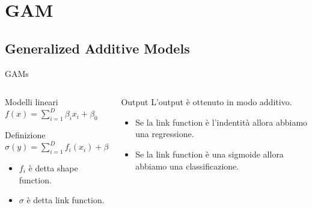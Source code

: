 \section{GAM}

\subsection{Generalized Additive Models}

\begin{frame}{GAMs}
    \begin{columns}
        \begin{column}{.45\textwidth}
            \begin{block}{Modelli lineari}
                $f(x)=\sum_{i=1}^D\beta_ix_i+\beta_0$
            \end{block}
            \begin{block}{Definizione}
                $\sigma(y)=\sum_{i=1}^Df_i(x_i)+\beta$
                \begin{itemize}
                    \item $f_i$ è detta shape function.
                    \item $\sigma$ è detta link function.
                \end{itemize}
            \end{block}
        \end{column}
        \begin{column}{.45\textwidth}
            \begin{block}{Output}
                L'output è ottenuto in modo additivo.
                \begin{itemize}
                    \item Se la link function è l'indentità allora abbiamo una regressione.
                    \item Se la link function è una sigmoide allora abbiamo una classificazione.
                \end{itemize}
            \end{block}
        \end{column}
    \end{columns}
\end{frame}